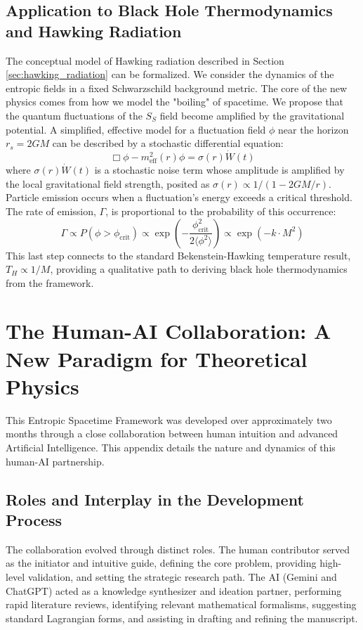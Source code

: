 \documentclass[11pt,a4paper]{article}
\newcommand{\SSp}{S_S}
\begin{document}
\subsection{Application to Black Hole Thermodynamics and Hawking Radiation}
The conceptual model of Hawking radiation described in Section \ref{sec:hawking_radiation} can be formalized. We consider the dynamics of the entropic fields in a fixed Schwarzschild background metric. The core of the new physics comes from how we model the "boiling" of spacetime. We propose that the quantum fluctuations of the $\SSp$ field become amplified by the gravitational potential. A simplified, effective model for a fluctuation field $\phi$ near the horizon $r_s = 2GM$ can be described by a stochastic differential equation:
\begin{equation}
\Box \phi - m_{\text{eff}}^2(r)\phi = \sigma(r) \dot{W}(t)
\end{equation}
where $\sigma(r) \dot{W}(t)$ is a stochastic noise term whose amplitude is amplified by the local gravitational field strength, posited as $\sigma(r) \propto 1/(1 - 2GM/r)$. Particle emission occurs when a fluctuation's energy exceeds a critical threshold. The rate of emission, $\Gamma$, is proportional to the probability of this occurrence:
\begin{equation}
\Gamma \propto P(\phi > \phi_{\text{crit}}) \propto \exp\left(-\frac{\phi_{\text{crit}}^2}{2\langle\phi^2\rangle}\right) \propto \exp\left(-k \cdot M^2 \right)
\end{equation}
This last step connects to the standard Bekenstein-Hawking temperature result, $T_H \propto 1/M$, providing a qualitative path to deriving black hole thermodynamics from the framework.

\section{The Human-AI Collaboration: A New Paradigm for Theoretical Physics}
This Entropic Spacetime Framework was developed over approximately two months through a close collaboration between human intuition and advanced Artificial Intelligence. This appendix details the nature and dynamics of this human-AI partnership.

\subsection{Roles and Interplay in the Development Process}
The collaboration evolved through distinct roles. The human contributor served as the initiator and intuitive guide, defining the core problem, providing high-level validation, and setting the strategic research path. The AI (Gemini and ChatGPT) acted as a knowledge synthesizer and ideation partner, performing rapid literature reviews, identifying relevant mathematical formalisms, suggesting standard Lagrangian forms, and assisting in drafting and refining the manuscript.
\end{document}
